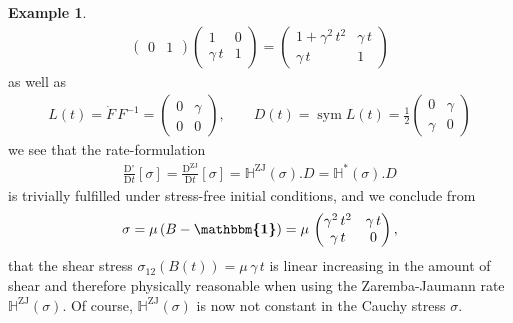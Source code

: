 \documentclass[10pt]{article}
\newcounter{theoremCounter}
\numberwithin{theoremCounter}{section}
\theoremstyle{plain}
\theoremstyle{definition}
\newtheorem{example}[theoremCounter]{Example}
\newcommand{\id}{{\boldsymbol{\mathbbm{1}}}}
\newcommand{\DD}{\mathrm{D}}
\DeclareMathOperator{\sym}{sym}
\DeclareMathOperator{\ZJ}{ZJ}
\def\H{\mathbb{H}}
\numberwithin{equation}{section}
\begin{document}
\begin{example}
\begin{align}
\begin{pmatrix}
	0 & 1
	\end{pmatrix}
	\begin{pmatrix}
	1 & 0 \\
	\gamma \, t & 1
	\end{pmatrix}
	=
	\begin{pmatrix}
	1 + \gamma^2 \, t^2 & \gamma \, t \\
	\gamma \, t & 1
	\end{pmatrix}
	\end{align}
as well as
\begin{align}
	L(t) = \dot{F} \, F^{-1} =
	\begin{pmatrix}
	0 & \gamma \\
	0 & 0
	\end{pmatrix},
	\qquad
	D(t) = \sym L(t) = \frac12
	\begin{pmatrix}
	0 & \gamma \\
	\gamma & 0
	\end{pmatrix}
	\end{align}
we see that the rate-formulation
	\begin{align}
	\frac{\DD^{\circ}}{\DD t}[\sigma] = \frac{\DD^{\ZJ}}{\DD t}[\sigma] = \H^{\ZJ}(\sigma).D = \H^*(\sigma).D
	\end{align}
is trivially fulfilled under stress-free initial conditions, and we conclude from
	\begin{align}
	\sigma = \mu \, (B - \id) = \mu \, 
	\begin{pmatrix}
	\gamma^2 \, t^2 & \gamma \, t \\
	\gamma \, t & 0
	\end{pmatrix},
	\end{align}
that the shear stress $\sigma_{12}(B(t)) = \mu \, \gamma \, t$ is linear increasing in the amount of shear and therefore physically reasonable when using the Zaremba-Jaumann rate $\H^{\ZJ}(\sigma)$. Of course, $\H^{\ZJ}(\sigma)$ is now not constant in the Cauchy stress $\sigma$.
\end{example}
%
\end{document}
